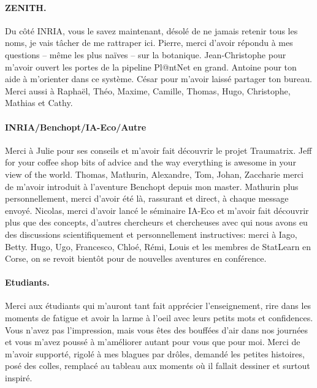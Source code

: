 \paragraph*{ZENITH.}
Du côté INRIA, vous le savez maintenant, désolé de ne jamais retenir tous les noms, je vais tâcher de me rattraper ici.
Pierre, merci d'avoir répondu à mes questions -- même les plus naïves -- sur la botanique. Jean-Christophe pour m'avoir ouvert les portes de la pipeline Pl@ntNet en grand. Antoine pour ton aide à m'orienter dans ce système.
César pour m'avoir laissé partager ton bureau.
Merci aussi à Raphaël, Théo, Maxime, Camille, Thomas, Hugo, Christophe, Mathias et Cathy.

\medskip

\paragraph*{INRIA/Benchopt/IA-Eco/Autre}
Merci à Julie pour ses conseils et m'avoir fait découvrir le projet Traumatrix.
Jeff for your coffee shop bits of advice and the way everything is awesome in your view of the world.
Thomas, Mathurin, Alexandre, Tom, Johan, Zaccharie merci de m'avoir introduit à l'aventure Benchopt depuis mon master.
Mathurin plus personnellement, merci d'avoir été là, rassurant et direct, à chaque message envoyé.
Nicolas, merci d'avoir lancé le séminaire IA-Eco et m'avoir fait découvrir plus que des concepts, d'autres chercheurs et chercheuses avec qui nous avons eu des discussions scientifiquement et personnellement instructives: merci à Iago, Betty.
Hugo, Ugo, Francesco, Chloé, Rémi, Louis et les membres de StatLearn en Corse, on se revoit bientôt pour de nouvelles aventures en conférence.

\medskip

\paragraph*{Etudiants.}
Merci aux étudiants qui m'auront tant fait apprécier l'enseignement, rire dans les moments de fatigue et avoir la larme à l'oeil avec leurs petits mots et confidences.
Vous n'avez pas l'impression, mais vous êtes des bouffées d'air dans nos journées et vous m'avez poussé à m'améliorer autant pour vous que pour moi.
Merci de m'avoir supporté, rigolé à mes blagues par drôles, demandé les petites histoires, posé des colles, remplacé au tableau aux moments où il fallait dessiner et surtout inspiré.

